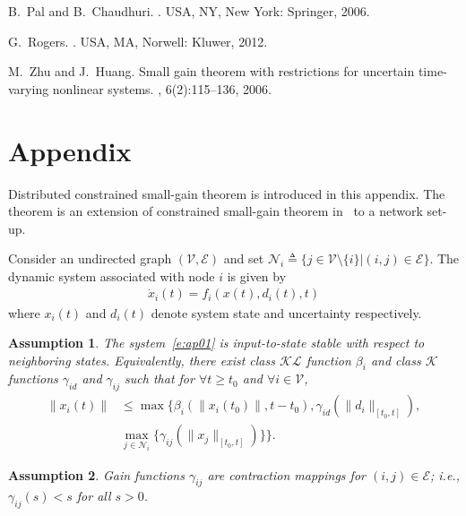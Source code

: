 \documentclass[journal]{IEEEtran}
\newcommand{\nnum}{\nonumber}
\newcommand{\EE}{{\mathcal{E}}}
\newcommand{\NN}{{\mathcal{N}}}
\newcommand{\VV}{{\mathcal{V}}}
\newtheorem{assumption}{\bf Assumption}[section]
\begin{document}
\begin{thebibliography}{10}
B.~Pal and B.~Chaudhuri.
.
\newblock USA, NY, New York: Springer, 2006.

G.~Rogers.
.
\newblock USA, MA, Norwell: Kluwer, 2012.

M.~Zhu and J.~Huang.
\newblock Small gain theorem with restrictions for uncertain time-varying
  nonlinear systems.
, 6(2):115--136, 2006.

\end{thebibliography}


\appendix



\section{Appendix}




Distributed constrained small-gain theorem is introduced in this appendix.
The theorem is an extension of constrained small-gain theorem in~\cite{MZ-JH:CIS06} to a network set-up.


Consider an undirected graph $({\VV},\EE)$ and set ${{\NN}}_i \triangleq \{j \in {\VV} \setminus \{i\} | (i,j) \in \EE\}$.
The dynamic system associated with node $i$ is given by
\begin{align}
\dot{x}_i(t) = f_i(x(t),d_i(t),t)
\label{e:ap01}
\end{align}
where $x_i(t)$ and $d_i(t)$ denote system state and uncertainty respectively.
\begin{assumption}
The system~\eqref{e:ap01} is input-to-state stable with respect to neighboring states. Equivalently, there exist class $\mathcal{KL}$ function $\beta_i$ and class $\mathcal{K}$ functions $\gamma_{id}$ and $\gamma_{ij}$ such that for $\forall t \geq t_0$ and $\forall i \in {\VV}$,
\label{ap-asm1}
\begin{align}
\|x_i(t)\| &\leq \max\{\beta_i(\|x_i(t_0)\|, t-t_0), \gamma_{id}(\|d_i\|_{[t_0, t]}), \nnum\\
&\max_{j \in {{\NN}}_i}\{\gamma_{ij}(\|x_j\|_{[t_0,t]})\}\}.
\label{ap-e12}
\end{align}
\end{assumption}

\begin{assumption}
Gain functions $\gamma_{ij}$ are contraction mappings for $(i,j) \in \EE$; i.e., $\gamma_{ij}(s) < s$ for all $s>0$.
\label{ap-asm2}
\end{assumption}
\end{document}
